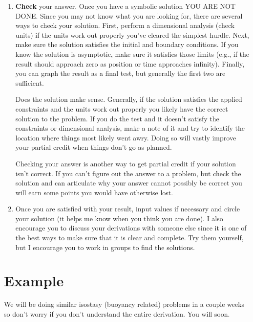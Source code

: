 \documentclass[final,a4paper,12pt]{article}
\begin{document}
\begin{enumerate}
    This not only makes it easier to assign partial credit, but also means that
    the solution you have at the end can be used for any set of inputs, not just
    the ones you currently have.  If we always inserted values at the earliest
    possible point, we would have to rederive the result every time we wanted to
    change our inputs.

    \item {\bf Check} your answer.  Once you have a symbolic solution YOU ARE
    NOT DONE.  Since you may not know what you are looking for, there are
    several ways to check your solution.  First, perform a dimensional analysis
    (check units) if the units work out properly you've cleared the simplest
    hurdle.  Next, make sure the solution satisfies the initial and boundary
    conditions.  If you know the solution is asymptotic, make sure it satisfies
    those limits (e.g., if the result should approach zero as position or time
    approaches infinity).  Finally, you can graph the result as a final test, but
    generally the first two are sufficient.

    Does the solution make sense.  Generally, if the solution satisfies the
    applied constraints and the units work out properly you likely have the
    correct solution to the problem.  If you do the test and it doesn't satisfy
    the constraints or dimensional analysis, make a note of it and try to
    identify the location where things most likely went awry.  Doing so will
    vastly improve your partial credit when things don't go as planned.

    Checking your answer is another way to get partial credit if your solution
    isn't correct.  If you can't figure out the answer to a problem, but check
    the solution and can articulate why your answer cannot possibly be correct
    you will earn some points you would have otherwise lost.

    \item Once you are satisfied with your result, input values if necessary and
    circle your solution (it helps me know when you think you are done).  I also
    encourage you to discuss your derivations with someone else since it is one
    of the best ways to make sure that it is clear and complete.  Try them
    yourself, but I encourage you to work in groups to find the solutions.
\end{enumerate}


\section{Example}
We will be doing similar isostasy (buoyancy related) problems in a couple weeks
so don't worry if you don't understand the entire derivation.  You will soon.
\end{document}
